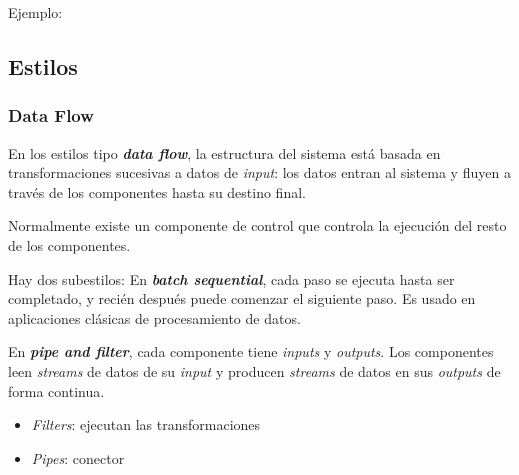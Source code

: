 \documentclass[]{article}
\begin{document}
Ejemplo:


\subsection{Estilos}
\subsubsection{Data Flow}
En los estilos tipo \emph{\textbf{data flow}}, la estructura del sistema está basada en transformaciones sucesivas a datos de \emph{input}: los datos entran al sistema y fluyen a través de los componentes hasta su destino final.

Normalmente existe un componente de control que controla la ejecución del resto de los componentes.

Hay dos subestilos:
En \emph{\textbf{batch sequential}}, cada paso se ejecuta hasta ser completado, y recién después puede comenzar el siguiente paso. Es usado en aplicaciones clásicas de procesamiento de datos.


En \emph{\textbf{pipe and filter}}, cada componente tiene \emph{inputs} y \emph{outputs}. Los componentes leen \emph{streams} de datos de su \emph{input} y producen \emph{streams} de datos en sus \emph{outputs} de forma continua.
\begin{itemize}
    \item \emph{Filters}: ejecutan las transformaciones
    \item \emph{Pipes}: conector
\end{itemize}


\end{document}
